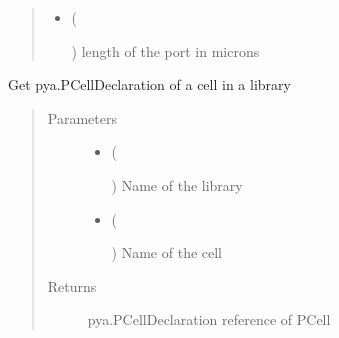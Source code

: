 \documentclass[a4paper,10pt,english]{sphinxmanual}
\begin{document}
\begin{fulllineitems}
\begin{fulllineitems}
\begin{quote}
\begin{description}
\begin{itemize}
\item {} 
 (%
\begin{footnote}[53]\sphinxAtStartFootnote
{}
%
\end{footnote}) \textendash{} length of the port in microns

\end{itemize}

\end{description}\end{quote}

\end{fulllineitems}


\begin{fulllineitems}
\label{\detokenize{photonics:kppc.photonics.PhotDevice.decl}}
Get pya.PCellDeclaration of a cell in a library
\begin{quote}\begin{description}
\item[{Parameters}] \leavevmode\begin{itemize}
\item {} 
 (%
\begin{footnote}[54]\sphinxAtStartFootnote
{}
%
\end{footnote}) \textendash{} Name of the library

\item {} 
 (%
\begin{footnote}[55]\sphinxAtStartFootnote
{}
%
\end{footnote}) \textendash{} Name of the cell

\end{itemize}

\item[{Returns}] \leavevmode
pya.PCellDeclaration reference of PCell


\end{description}
\end{quote}
\end{fulllineitems}
\end{fulllineitems}
\end{document}
